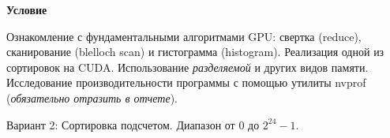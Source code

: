 \textbf{\large Условие}

Ознакомление с фундаментальными алгоритмами GPU: свертка (reduce), сканирование (blelloch scan) и гистограмма (histogram). Реализация одной из сортировок на CUDA. Использование \textit{разделяемой} и других видов памяти. Исследование производительности программы с помощью утилиты nvprof
(\textit{обязательно отразить в отчете}).

Вариант 2: Сортировка подсчетом. Диапазон от $0$ до $2^{24} - 1$.

